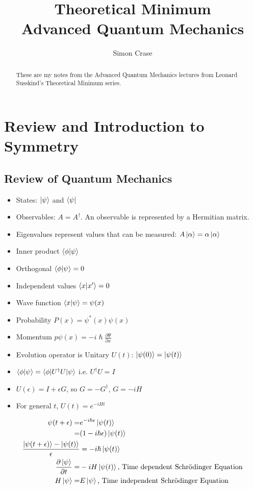 \documentclass[]{article}
\title{Theoretical Minimum\\Advanced Quantum Mechanics}
\author{Simon Crase}
\begin{document}
\maketitle

\begin{abstract}
These are my notes from the Advanced Quantum Mechanics lectures from Leonard Susskind's Theoretical Minimum series.
\end{abstract}

\tableofcontents
\listoffigures
\listoftheorems


\section{Review and Introduction to Symmetry}

\subsection{Review of Quantum Mechanics}

\begin{itemize}
	\item States: $\ket{\psi}$ and $\bra{\psi}$
	\item Observables: $A=A^{\dag}$. An observable is represented by a Hermitian matrix.
	\item Eigenvalues represent values that can be measured: $A\ket{\alpha} = \alpha\ket{\alpha}$
	\item Inner product $\braket{\phi|\psi}$	
	\item Orthogonal $\braket{\phi|\psi}=0$
	\item Independent values $\braket{x|x^{\prime}}=0$
	\item Wave function $\braket{x|\psi} = \psi(x)$
	\item Probability $P(x)=\psi^*(x)\psi(x)$
	\item Momentum $p\psi(x)=- i \hslash \frac{\partial \Psi}{\partial x}$
	\item Evolution operator is Unitary $U(t)$: $\ket{\psi(0)} = \ket{\psi(t)}$
	\item $\braket{\phi|\psi}=\braket{\phi|U^{\dagger}U|\psi}$ i.e. $U^{\dagger}U=I$
	\item $U(\epsilon)= I + \epsilon G$, so $G=-G^{\dagger}$, $G=- i H$
	\item For general $t$, $U(t)=e^{- i H t}$
\end{itemize}

\begin{align*}
\psi(t+\epsilon) =& e^{-i \hslash \epsilon} \ket{\psi(t)}\\
=& (1- i \hslash \epsilon)\ket{\psi(t)}\\
\frac{\ket{\psi(t+\epsilon)} -\ket{\psi(t)} }{\epsilon}&= -i \hslash \ket{\psi(t)}\\
\frac{\partial \ket{\psi}}{\partial t} =& -i H \ket{\psi(t)} \text{, Time dependent Schr\"odinger Equation}\\
H \ket{\psi} =& E \ket{\psi}\text{, Time independent Schr\"odinger Equation}
\end{align*} 
\end{document}
